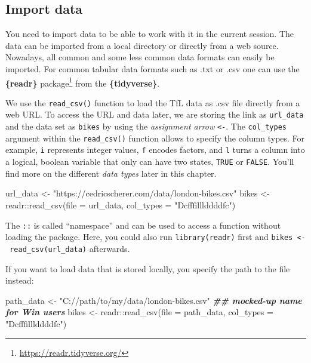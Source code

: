\documentclass[
]{krantz}
\makeatletter
\newenvironment{Shaded}{\begin{snugshade}}{\end{snugshade}}
\newcommand{\AttributeTok}[1]{\textcolor[rgb]{0.61,0.61,0.61}{#1}}
\newcommand{\DocumentationTok}[1]{\textcolor[rgb]{0.37,0.37,0.37}{\textbf{\textit{#1}}}}
\newcommand{\FunctionTok}[1]{\textcolor[rgb]{0,0,0}{#1}}
\newcommand{\NormalTok}[1]{#1}
\newcommand{\OtherTok}[1]{\textcolor[rgb]{0.37,0.37,0.37}{#1}}
\newcommand{\SpecialCharTok}[1]{\textcolor[rgb]{0,0,0}{#1}}
\newcommand{\StringTok}[1]{\textcolor[rgb]{0.5,0.5,0.5}{#1}}
\renewcommand{\href}[2]{#2\footnote{\url{#1}}}
\newenvironment{kframe}{%
\medskip{}
\setlength{\fboxsep}{.8em}
 \def\at@end@of@kframe{}%
 \ifinner\ifhmode%
  \def\at@end@of@kframe{\end{minipage}}%
  \begin{minipage}{\columnwidth}%
 \fi\fi%
 \def\FrameCommand##1{\hskip\@totalleftmargin \hskip-\fboxsep
 \colorbox{shadecolor}{##1}\hskip-\fboxsep
     \hskip-\linewidth \hskip-\@totalleftmargin \hskip\columnwidth}%
 \MakeFramed {\advance\hsize-\width
   \@totalleftmargin\z@ \linewidth\hsize
   \@setminipage}}%
 {\par\unskip\endMakeFramed%
 \at@end@of@kframe}
\renewenvironment{Shaded}{\begin{kframe}}{\end{kframe}}
\makeatother
\begin{document}
\hypertarget{import}{%
\subsection{Import data}\label{import}}

You need to import data to be able to work with it in the current session. The data can be imported from a local directory or directly from a web source. Nowadays, all common and some less common data formats can easily be imported. For common tabular data formats such as .txt or .csv one can use the \href{https://readr.tidyverse.org/}{\textbf{\{readr\}} package} \citep{readr} from the \textbf{\{tidyverse\}}.

We use the \texttt{read\_csv()} function to load the TfL data as .csv file directly from a web URL. To access the URL and data later, we are storing the link as \texttt{url\_data} and the data set as \texttt{bikes} by using the \emph{assignment arrow} \texttt{\textless{}-}. The \texttt{col\_types} argument within the \texttt{read\_csv()} function allows to specify the column types. For example, \texttt{i} represents integer values, \texttt{f} encodes factors, and \texttt{l} turns a column into a logical, boolean variable that only can have two states, \texttt{TRUE} or \texttt{FALSE}. You'll find more on the different \emph{data types} later in this chapter.

\begin{Shaded}
\begin{Highlighting}[]
\NormalTok{url\_data }\OtherTok{\textless{}{-}} \StringTok{"https://cedricscherer.com/data/london{-}bikes.csv"}
\NormalTok{bikes }\OtherTok{\textless{}{-}}\NormalTok{ readr}\SpecialCharTok{::}\FunctionTok{read\_csv}\NormalTok{(}\AttributeTok{file =}\NormalTok{ url\_data, }\AttributeTok{col\_types =} \StringTok{"Dcfffilllddddfc"}\NormalTok{)}
\end{Highlighting}
\end{Shaded}

The \texttt{::} is called ``namespace'' and can be used to access a function without loading the package. Here, you could also run \texttt{library(readr)} first and \texttt{bikes\ \textless{}-\ read\_csv(url\_data)} afterwards.

If you want to load data that is stored locally, you specify the path to the file instead:

\begin{Shaded}
\begin{Highlighting}[]
\NormalTok{path\_data }\OtherTok{\textless{}{-}} \StringTok{"C://path/to/my/data/london{-}bikes.csv"} \DocumentationTok{\#\# mocked{-}up name for Win users}
\NormalTok{bikes }\OtherTok{\textless{}{-}}\NormalTok{ readr}\SpecialCharTok{::}\FunctionTok{read\_csv}\NormalTok{(}\AttributeTok{file =}\NormalTok{ path\_data, }\AttributeTok{col\_types =} \StringTok{"Dcfffilllddddfc"}\NormalTok{)}
\end{Highlighting}
\end{Shaded}
\end{document}

